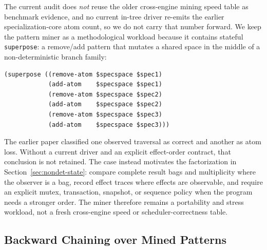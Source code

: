 \documentclass[11pt]{article}
\newcommand{\code}[1]{\texttt{#1}}
\begin{document}
The current audit does \emph{not} reuse the older cross-engine mining
speed table as benchmark evidence, and no current in-tree driver
re-emits the earlier specialization-core atom count, so we do not carry
that number forward.  We keep the pattern miner as a methodological
workload because it contains stateful \code{superpose}: a remove/add
pattern that mutates a shared space in the middle of a non-deterministic
branch family:
\begin{lstlisting}[language={},basicstyle=\ttfamily\scriptsize]
(superpose ((remove-atom $specspace $spec1)
            (add-atom    $specspace $spec1)
            (remove-atom $specspace $spec2)
            (add-atom    $specspace $spec2)
            (remove-atom $specspace $spec3)
            (add-atom    $specspace $spec3)))
\end{lstlisting}
The earlier paper classified one observed traversal as correct and another
as atom loss.  Without a current driver and an explicit effect-order
contract, that conclusion is not retained.  The case instead motivates the
factorization in Section~\ref{sec:nondet-state}: compare complete result bags
and multiplicity where the observer is a bag, record effect traces where
effects are observable, and require an explicit mutex, transaction, snapshot,
or sequence policy when the program needs a stronger order.  The miner
therefore remains a portability and stress workload, not a fresh cross-engine
speed or scheduler-correctness table.

\subsection{Backward Chaining over Mined Patterns}
\end{document}
